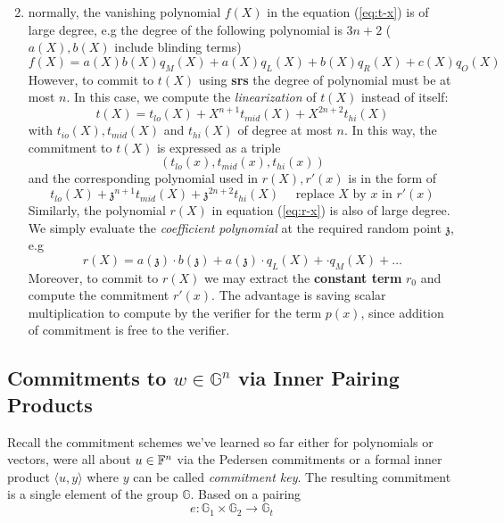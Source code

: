\documentclass{article}
\begin{document}
\begin{enumerate}
\begin{equation*}
\end{equation*}
\item\label{item:116} normally, the vanishing polynomial $f(X)$ in the equation (\ref{eq:t-x}) is of large degree, e.g the degree of the following polynomial is $3n + 2$ ($a(X), b(X)$ include blinding terms)
\begin{equation*}
f(X) = a(X)b(X)q_M(X) + a(X)q_L(X) + b(X)q_R(X) + c(X)q_O(X)
\end{equation*}
However, to commit to $t(X)$ using \textbf{srs} the degree of polynomial must be at most $n$. In this case, we compute the \textit{linearization} of $t(X)$ instead of itself:
\begin{equation*}
t(X) = t_{lo}(X) + X^{n+1} t_{mid}(X) + X^{2n+2} t_{hi}(X)
\end{equation*}
with $t_{io}(X), t_{mid}(X)$ and $t_{hi}(X)$ of degree at most $n$. In this way, the commitment to $t(X)$ is expressed as a triple 
\begin{equation*}
\left( t_{lo}(x), t_{mid}(x), t_{hi}(x) \right)
\end{equation*}
and the corresponding polynomial used in $r(X), r'(x)$ is in the form of
\begin{equation*}
t_{lo}(X) + \mathfrak{z}^{n+1} t_{mid}(X) + \mathfrak{z}^{2n+2} t_{hi}(X) \quad \text{ replace } X \text{ by } x \text{ in } r'(x)
\end{equation*}
Similarly, the polynomial $r(X)$ in equation (\ref{eq:r-x}) is also of large degree. We simply evaluate the \textit{coefficient polynomial} at the required random point $\mathfrak{z}$, e.g
\begin{equation*}
r(X) = a(\mathfrak{z}) \cdot b(\mathfrak{z}) + a(\mathfrak{z}) \cdot q_L(X) + \cdot q_M(X) + \dots
\end{equation*}
Moreover, to commit to $r(X)$ we may extract the \textbf{constant term} $r_0$ and compute the commitment $r'(x)$. The advantage is saving scalar multiplication to compute by the verifier for the term $p(x)$, since addition of commitment is free to the verifier. 
\end{enumerate}



\subsection{Commitments to $w \in \mathbb{G}^n$ via Inner Pairing Products }

Recall the commitment schemes we've learned so far either for polynomials or vectors, were all about $u \in \mathbb{F}^n$ via the Pedersen commitments or a formal inner product $\langle u, y \rangle$ where $y$ can be called \textit{commitment key}. The resulting commitment is a single element of the group $\mathbb{G}$. Based on a pairing
\begin{equation*}
e: \mathbb{G}_1 \times \mathbb{G}_2 \rightarrow \mathbb{G}_t
\end{equation*}
\end{document}
